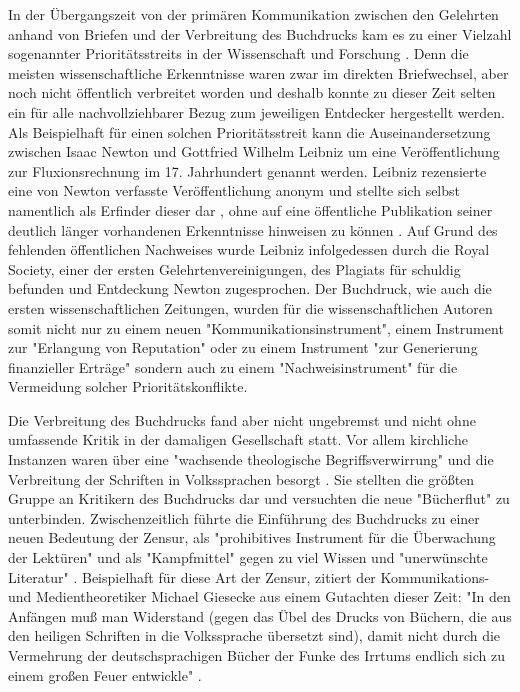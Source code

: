 In der Übergangszeit von der primären Kommunikation zwischen den Gelehrten anhand von Briefen und der Verbreitung des Buchdrucks kam es zu einer Vielzahl sogenannter Prioritätsstreits in der Wissenschaft und Forschung \cite{schirmbacher_2009_wisspub}. Denn die meisten wissenschaftliche Erkenntnisse waren zwar im direkten Briefwechsel, aber noch nicht öffentlich verbreitet worden und deshalb konnte zu dieser Zeit selten ein für alle nachvollziehbarer Bezug zum jeweiligen Entdecker hergestellt werden. Als Beispielhaft für einen solchen Prioritätsstreit kann die Auseinandersetzung zwischen Isaac Newton und Gottfried Wilhelm Leibniz um eine Veröffentlichung zur Fluxionsrechnung im 17. Jahrhundert genannt werden. Leibniz rezensierte eine von Newton verfasste Veröffentlichung anonym und stellte sich selbst namentlich als Erfinder dieser dar \cite{2013_leibniz}, ohne auf eine öffentliche Publikation seiner deutlich länger vorhandenen Erkenntnisse hinweisen zu können \cite{schirmbacher_2009_wisspub}. Auf Grund des fehlenden öffentlichen Nachweises wurde Leibniz infolgedessen durch die Royal Society, einer der ersten Gelehrtenvereinigungen, des Plagiats für schuldig befunden und Entdeckung Newton zugesprochen. Der Buchdruck, wie auch die ersten wissenschaftlichen Zeitungen, wurden für die wissenschaftlichen Autoren somit nicht nur zu einem neuen "Kommunikationsinstrument", einem Instrument zur "Erlangung von Reputation" oder zu einem Instrument "zur Generierung finanzieller Erträge" sondern auch zu einem "Nachweisinstrument" \cite{wunderlich_2008_buchdruck} \cite{schirmbacher_2009_wisspub} für die Vermeidung solcher Prioritätskonflikte.

Die Verbreitung des Buchdrucks fand aber nicht ungebremst und nicht ohne umfassende Kritik in der damaligen Gesellschaft statt. Vor allem kirchliche Instanzen waren über eine "wachsende theologische Begriffsverwirrung" und die Verbreitung der Schriften in Volkssprachen besorgt \cite{giesecke_1991_buchdruck}. Sie stellten die größten Gruppe an Kritikern des Buchdrucks dar und versuchten die neue "Bücherflut" zu unterbinden\cite{giesecke_1991_buchdruck}. Zwischenzeitlich führte die Einführung des Buchdrucks zu einer neuen Bedeutung der Zensur, als "prohibitives Instrument für die Überwachung der Lektüren" und als "Kampfmittel" \cite{sprachgeschichte_1998_besch} gegen zu viel Wissen \cite{suchen} und "unerwünschte Literatur" \cite{suchen}. Beispielhaft für diese Art der Zensur, zitiert der Kommunikations- und Medientheoretiker Michael Giesecke aus einem Gutachten dieser Zeit: "In den Anfängen muß man Widerstand (gegen das Übel des Drucks von Büchern, die aus den heiligen Schriften in die Volkssprache übersetzt sind), damit nicht durch die Vermehrung der deutschsprachigen Bücher der Funke des Irrtums endlich sich zu einem großen Feuer entwickle" \cite{giesecke_1991_buchdruck}.

